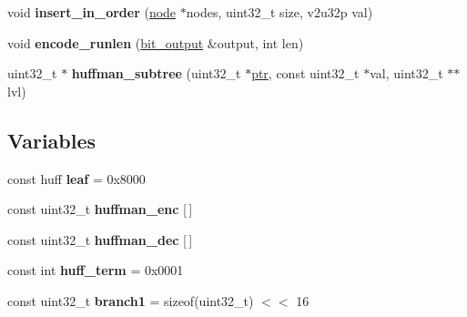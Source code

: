 \begin{DoxyCompactItemize}
\item 
\mbox{\label{namespaceeka2l1_1_1flate_1_1huffman_a54d4d13e22baa8339f6d9392f9d87f9b}} 
void {\bfseries insert\+\_\+in\+\_\+order} (\mbox{\hyperlink{structeka2l1_1_1flate_1_1huffman_1_1node}{node}} $\ast$nodes, uint32\+\_\+t size, v2u32p val)
\item 
\mbox{\label{namespaceeka2l1_1_1flate_1_1huffman_a9b2edccff002a12e51eec443d4639b6d}} 
void {\bfseries encode\+\_\+runlen} (\mbox{\hyperlink{classeka2l1_1_1flate_1_1bit__output}{bit\+\_\+output}} \&output, int len)
\item 
\mbox{\label{namespaceeka2l1_1_1flate_1_1huffman_a5e142c5275741a3891cb43805ce1e64f}} 
uint32\+\_\+t $\ast$ {\bfseries huffman\+\_\+subtree} (uint32\+\_\+t $\ast$\mbox{\hyperlink{classeka2l1_1_1ptr}{ptr}}, const uint32\+\_\+t $\ast$val, uint32\+\_\+t $\ast$$\ast$lvl)
\end{DoxyCompactItemize}
\subsection*{Variables}
\begin{DoxyCompactItemize}
\item 
\mbox{\label{namespaceeka2l1_1_1flate_1_1huffman_a3f06e547f120f2105a37cf47632b83d0}} 
const huff {\bfseries leaf} = 0x8000
\item 
\mbox{\label{namespaceeka2l1_1_1flate_1_1huffman_a229dddd048bc3823f4dfa2da52f03aff}} 
const uint32\+\_\+t {\bfseries huffman\+\_\+enc} \mbox{[}$\,$\mbox{]}
\item 
const uint32\+\_\+t {\bfseries huffman\+\_\+dec} \mbox{[}$\,$\mbox{]}
\item 
\mbox{\label{namespaceeka2l1_1_1flate_1_1huffman_a99e3dfff1e48b822823a1bc55e9defc6}} 
const int {\bfseries huff\+\_\+term} = 0x0001
\item 
\mbox{\label{namespaceeka2l1_1_1flate_1_1huffman_aedf367badbc32a0647144a9cb5c799a8}} 
const uint32\+\_\+t {\bfseries branch1} = sizeof(uint32\+\_\+t) $<$$<$ 16
\end{DoxyCompactItemize}


